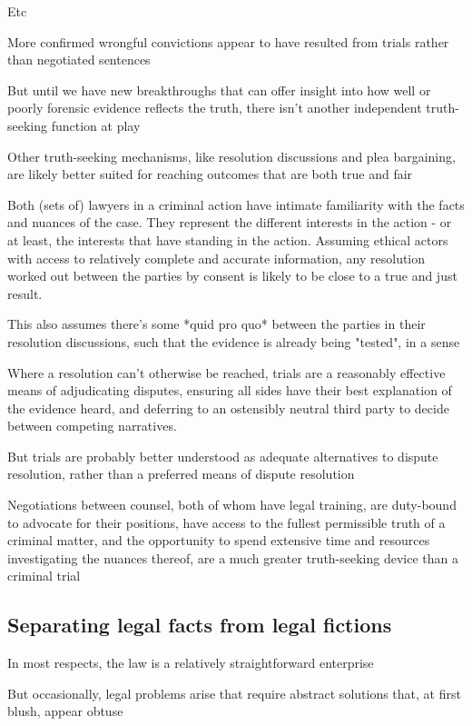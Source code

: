 Etc

More confirmed wrongful convictions appear to have resulted from trials rather than negotiated sentences

But until we have new breakthroughs that can offer insight into how well or poorly forensic evidence reflects the truth, there isn't another independent truth-seeking function at play

Other truth-seeking mechanisms, like resolution discussions and plea bargaining, are likely better suited for reaching outcomes that are both true and fair

Both (sets of) lawyers in a criminal action have intimate familiarity with the facts and nuances of the case. They represent the different interests in the action - or at least, the interests that have standing in the action. Assuming ethical actors with access to relatively complete and accurate information, any resolution worked out between the parties by consent is likely to be close to a true and just result.

This also assumes there's some *quid pro quo* between the parties in their resolution discussions, such that the evidence is already being "tested", in a sense

Where a resolution can't otherwise be reached, trials are a reasonably effective means of adjudicating disputes, ensuring all sides have their best explanation of the evidence heard, and deferring to an ostensibly neutral third party to decide between competing narratives.

But trials are probably better understood as adequate alternatives to dispute resolution, rather than a preferred means of dispute resolution

Negotiations between counsel, both of whom have legal training, are duty-bound to advocate for their positions, have access to the fullest permissible truth of a criminal matter, and the opportunity to spend extensive time and resources investigating the nuances thereof, are a much greater truth-seeking device than a criminal trial

\subsection{Separating legal facts from legal fictions}

In most respects, the law is a relatively straightforward enterprise

But occasionally, legal problems arise that require abstract solutions that, at first blush, appear obtuse

